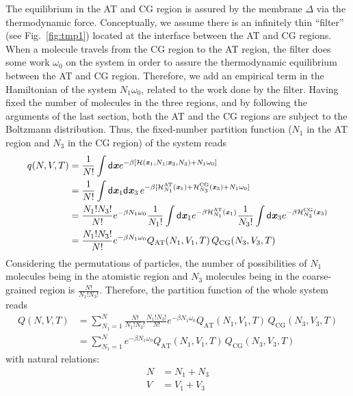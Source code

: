 \documentclass[aip,jcp,a4paper,reprint,onecolumn]{revtex4-1}
\newcommand{\vect}[1]{\textbf{\textit{#1}}}
\newcommand{\dd}[1]{\textsf{#1}}
\newcommand{\AT}{{\textrm{{AT}}}}
\newcommand{\CG}{{\textrm{CG}}}
\newcommand{\HY}{{\Delta}}
\begin{document}
The equilibrium in the AT and CG region is assured by the membrane $\HY$ via the thermodynamic force. Conceptually, we assume there is an infinitely thin
``filter'' (see Fig.~\ref{fig:tmp1}) located at the interface between
the AT and CG regions. When a molecule travels from the CG region to
the AT region, the filter does some work $\omega_0$ on the system in order to assure the thermodynamic equilibrium between the AT and CG region.
Therefore, we add an empirical term in the Hamiltonian of the system
$N_1\omega_0$, related to the work done  by the filter. 
Having fixed the number of molecules in the three regions, and by following the
arguments of the last section, both the AT and the CG regions are
subject to the Boltzmann distribution.
Thus, the fixed-number partition function ($N_1$ in the AT region and $N_3$ in the CG region) of the system reads
\begin{align}\nonumber
  q(N,V,T)
  &= \frac1{N!}\int
  \dd d\vect x
  e^{-\beta
    [\mathcal H(\vect x_1, N_1; \vect x_3, N_3) +
    N_1\omega_0]}\\\nonumber
  &= \frac1{N!}\int
  \dd d\vect x_1\dd d\vect x_3\,
  e^{-\beta
    [\mathcal H_{N_1}^{\AT}(\vect x_1) +
    \mathcal H_{N_3}^{\CG}(\vect x_3) +
    N_1\omega_0]}\\\nonumber
  & = \frac{N_1!N_3!}{N!}
  e^{-\beta N_1\omega_0}
  \frac{1}{N_1!}\int\dd d\vect x_1 e^{-\beta\mathcal H_{N_1}^{\AT}(\vect x_1)}
  \frac{1}{N_3!}\int\dd d\vect x_3 e^{-\beta\mathcal H_{N_3}^{\CG}(\vect x_3)}\\
  & = \frac{N_1!N_3!}{N!}
  e^{-\beta N_1\omega_0}
  Q_{\AT}(N_1, V_1, T)\,
  Q_{\CG}(N_3, V_3, T) 
\end{align}
Considering the permutations of particles, the number of possibilities of
$N_1$ molecules being in the atomistic region and $N_3$ molecules being
in the coarse-grained region is  $\frac{N!}{N_1!N_3!}$.
Therefore, the partition function of the whole system reads
\begin{align}\nonumber
  Q(N,V,T) &= \sum_{N_1=1}^N
  \frac{N!}{N_1!N_3!} \frac{N_1!N_3!}{N!}
  e^{-\beta N_1\omega_0}
  Q_{\AT}(N_1, V_1, T)\,
  Q_{\CG}(N_3, V_3, T) \\
  &= \sum_{N_1=1}^N
  e^{-\beta N_1\omega_0}
  Q_{\AT}(N_1, V_1, T)\,
  Q_{\CG}(N_3, V_3, T) 
\end{align}
with natural relations:
\begin{align}
  N &= N_1 + N_3\\
  V &= V_1 + V_3
\end{align}
\end{document}
